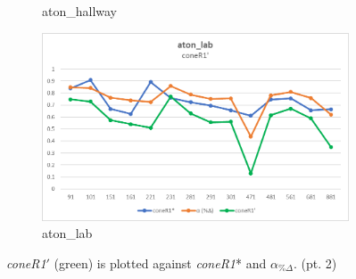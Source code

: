 \begin{appendices}
\begin{figure}
\begin{subfigure}{.45\linewidth}
  \caption{aton\_hallway}
\end{subfigure}
\hfill
\begin{subfigure}{.45\linewidth}
  \includegraphics[width=1\linewidth]{figures/appendix/lab_prime.jpg}
  \caption{aton\_lab}
\end{subfigure}

\caption{\textit{coneR1}$'$ (green) is plotted against \textit{coneR1}* and $\alpha_{\%\Delta}$. (pt. 2)}
\end{figure}


\end{appendices}
